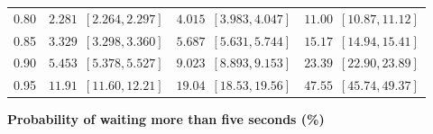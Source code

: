 {\begin{tabular*}{\linewidth}{@{\extracolsep{\fill}}rlll@{}}
0.80 & \(2.281\enspace[2.264,2.297]\) & \(4.015\enspace[3.983,4.047]\) & \(11.00\enspace[10.87,11.12]\) \\
0.85 & \(3.329\enspace[3.298,3.360]\) & \(5.687\enspace[5.631,5.744]\) & \(15.17\enspace[14.94,15.41]\) \\
0.90 & \(5.453\enspace[5.378,5.527]\) & \(9.023\enspace[8.893,9.153]\) & \(23.39\enspace[22.90,23.89]\) \\
0.95 & \(11.91\enspace[11.60,12.21]\) & \(19.04\enspace[18.53,19.56]\) & \(47.55\enspace[45.74,49.37]\) \\
\bottomrule
\end{tabular*}\par}

\medskip
\noindent\textbf{Probability of waiting more than five seconds (\%)}
\par\nobreak\smallskip
